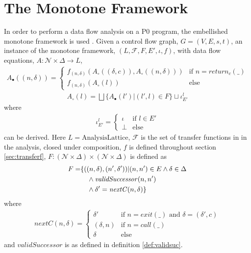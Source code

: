 \section{The Monotone Framework}
In order to perform a data flow analysis on a P0 program, the embellished monotone framework is used . Given a control flow graph, $G = (V,E,s,t)$, an instance of the monotone framework, $(L, \mathcal{F}, F, E', \iota, f)$, with data flow equations, $A :  \mathcal{N} \times \Delta \rightarrow L$, 
\begin{align}
	A_\bullet ((n, \delta)) = \begin{cases} 
		f_{(n, \delta)}(A_\circ((\delta, c)), A_\circ((n, \delta))) &\text{if $n=\mathit{return}_c(\_)$}\\
		f_{(n, \delta)}(A_\circ(l))& \text{else}
		\end{cases}
\end{align}
\begin{align}
	A_\circ (l) = \bigsqcup \{A_\bullet(l') | (l', l) \in F\} \sqcup \iota_{E'}^l
\end{align}
where 
\begin{align}
\iota_{E'}^l = \begin{cases} \iota & \text{if }l\in E' \\  \bot &\text{else} \end{cases}
\end{align}
can be derived. Here $L = \text{AnalysisLattice}$, $\mathcal{F}$ is the set of transfer functions in in the analysis, closed under composition, $f$ is defined throughout section \ref{sec:transferf}, $F : (\mathcal{N} \times \Delta) \times (\mathcal{N} \times \Delta)$ is defined as 
\begin{align}
F = &\{((n, \delta), (n', \delta')) | (n,n') \in E \wedge\delta \in \Delta \notag\\
&\quad \wedge \mathit{validSuccessor}(n, n')\notag\\
&\quad \wedge  \delta' = \mathit{nextC}( n, \delta)\}
\end{align} 
where 
\begin{align}
\mathit{nextC}(n,\delta) = 
	\begin{cases}
		\delta' & \text{if $n = \mathit{exit(\_)}$ and $\delta = (\delta', c)$}\\
		(\delta, n) &\text{if }n=\mathit{call}(\_)\\
		\delta &\text{else} 
	\end{cases}
\end{align} and $\mathit{validSuccessor}$ is as defined in definition \ref{def:validsuc}. 

